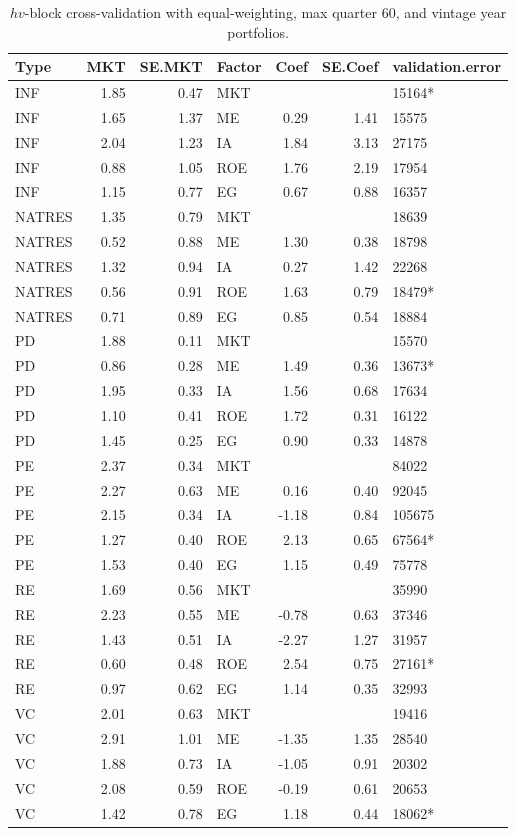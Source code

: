 \documentclass[12pt]{article}
\begin{document}
\begin{table}[ht]
	\centering
	\begin{tabular}{lrrlrrl}
		Type & MKT & SE.MKT & Factor & Coef & SE.Coef & validation.error \\ 
		\hline
		\hline
		INF & 1.85 & 0.47 & MKT &  &  & 15164* \\ 
		INF & 1.65 & 1.37 & ME & 0.29 & 1.41 & 15575 \\ 
		INF & 2.04 & 1.23 & IA & 1.84 & 3.13 & 27175 \\ 
		INF & 0.88 & 1.05 & ROE & 1.76 & 2.19 & 17954 \\ 
		INF & 1.15 & 0.77 & EG & 0.67 & 0.88 & 16357 \\ 
		\hline
		NATRES & 1.35 & 0.79 & MKT &  &  & 18639 \\ 
		NATRES & 0.52 & 0.88 & ME & 1.30 & 0.38 & 18798 \\ 
		NATRES & 1.32 & 0.94 & IA & 0.27 & 1.42 & 22268 \\ 
		NATRES & 0.56 & 0.91 & ROE & 1.63 & 0.79 & 18479* \\ 
		NATRES & 0.71 & 0.89 & EG & 0.85 & 0.54 & 18884 \\
		\hline
		PD & 1.88 & 0.11 & MKT &  &  & 15570 \\ 
		PD & 0.86 & 0.28 & ME & 1.49 & 0.36 & 13673* \\ 
		PD & 1.95 & 0.33 & IA & 1.56 & 0.68 & 17634 \\ 
		PD & 1.10 & 0.41 & ROE & 1.72 & 0.31 & 16122 \\ 
		PD & 1.45 & 0.25 & EG & 0.90 & 0.33 & 14878 \\ 
		\hline
		PE & 2.37 & 0.34 & MKT &  &  & 84022 \\ 
		PE & 2.27 & 0.63 & ME & 0.16 & 0.40 & 92045 \\ 
		PE & 2.15 & 0.34 & IA & -1.18 & 0.84 & 105675 \\ 
		PE & 1.27 & 0.40 & ROE & 2.13 & 0.65 & 67564* \\ 
		PE & 1.53 & 0.40 & EG & 1.15 & 0.49 & 75778 \\ 
		\hline
		RE & 1.69 & 0.56 & MKT &  &  & 35990 \\ 
		RE & 2.23 & 0.55 & ME & -0.78 & 0.63 & 37346 \\ 
		RE & 1.43 & 0.51 & IA & -2.27 & 1.27 & 31957 \\ 
		RE & 0.60 & 0.48 & ROE & 2.54 & 0.75 & 27161* \\ 
		RE & 0.97 & 0.62 & EG & 1.14 & 0.35 & 32993 \\ 
		\hline
		VC & 2.01 & 0.63 & MKT &  &  & 19416 \\ 
		VC & 2.91 & 1.01 & ME & -1.35 & 1.35 & 28540 \\ 
		VC & 1.88 & 0.73 & IA & -1.05 & 0.91 & 20302 \\ 
		VC & 2.08 & 0.59 & ROE & -0.19 & 0.61 & 20653 \\ 
		VC & 1.42 & 0.78 & EG & 1.18 & 0.44 & 18062* \\ 
		\hline
		\hline
	\end{tabular}
	\caption{$hv$-block cross-validation with equal-weighting, max quarter 60, and vintage year portfolios.} 
	\label{tab:cv_60_ew_dep_vyp}
\end{table}
\end{document}
